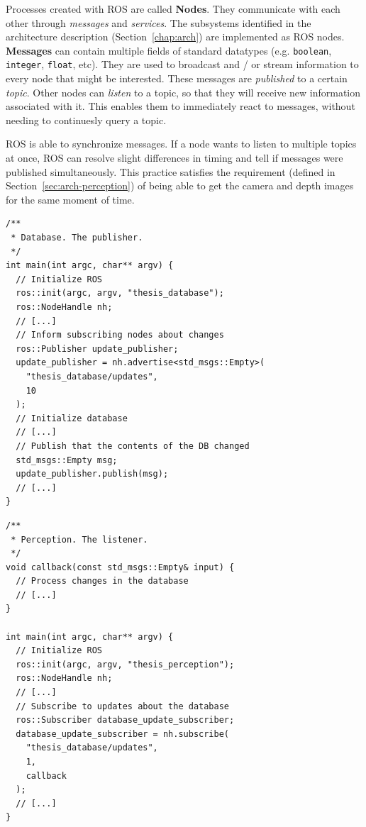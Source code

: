 Processes created with ROS are called \textbf{Nodes}. They communicate with each other through \textit{messages} and \textit{services}. The subsystems identified in the architecture description (Section~\ref{chap:arch}) are implemented as ROS nodes. \\

\textbf{Messages} can contain multiple fields of standard datatypes (e.g. \texttt{boolean}, \texttt{integer}, \texttt{float}, etc). They are used to broadcast and / or stream information to every node that might be interested. These messages are \textit{published} to a certain \textit{topic}. Other nodes can \textit{listen} to a topic, so that they will receive new information associated with it. This enables them to immediately react to messages, without needing to continuesly query a topic.

ROS is able to synchronize messages. If a node wants to listen to multiple topics at once, ROS can resolve slight differences in timing and tell if messages were published simultaneously. This practice satisfies the requirement (defined in Section~\ref{sec:arch-perception}) of being able to get the camera and depth images for the same moment of time.

\begin{lstlisting}[caption=An example for the use of ROS messages in this work. The database informs others about changes.]
/**
 * Database. The publisher.
 */
int main(int argc, char** argv) {
  // Initialize ROS
  ros::init(argc, argv, "thesis_database");
  ros::NodeHandle nh;
  // [...]
  // Inform subscribing nodes about changes
  ros::Publisher update_publisher;
  update_publisher = nh.advertise<std_msgs::Empty>(
    "thesis_database/updates",
    10
  );
  // Initialize database
  // [...]
  // Publish that the contents of the DB changed
  std_msgs::Empty msg;
  update_publisher.publish(msg);
  // [...]
}
\end{lstlisting}

\begin{lstlisting}[caption=An example for the use of ROS messages in this work. The perception reacts to changes to the database.]
/**
 * Perception. The listener.
 */
void callback(const std_msgs::Empty& input) {
  // Process changes in the database
  // [...]
}

int main(int argc, char** argv) {
  // Initialize ROS
  ros::init(argc, argv, "thesis_perception");
  ros::NodeHandle nh;
  // [...]
  // Subscribe to updates about the database
  ros::Subscriber database_update_subscriber;
  database_update_subscriber = nh.subscribe(
    "thesis_database/updates",
    1,
    callback
  );
  // [...]
}
\end{lstlisting}

